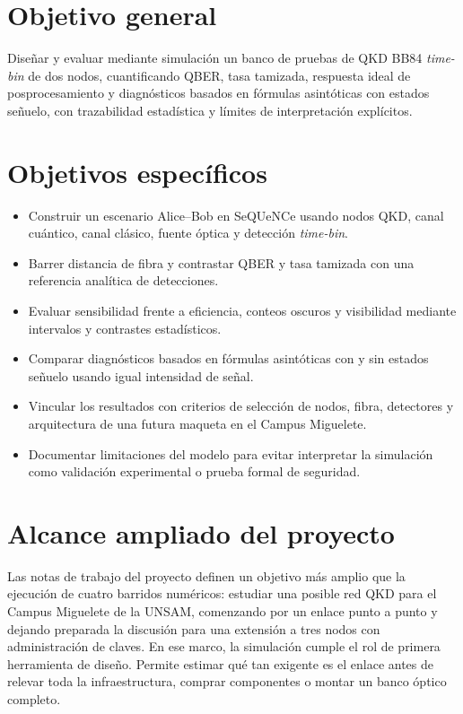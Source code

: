 \section{Objetivo general}

Diseñar y evaluar mediante simulación un banco de pruebas de QKD BB84 \textit{time-bin} de dos nodos, cuantificando QBER, tasa tamizada, respuesta ideal de posprocesamiento y diagnósticos basados en fórmulas asintóticas con estados señuelo, con trazabilidad estadística y límites de interpretación explícitos.

\section{Objetivos específicos}

\begin{itemize}
  \item Construir un escenario Alice--Bob en SeQUeNCe usando nodos QKD, canal cuántico, canal clásico, fuente óptica y detección \textit{time-bin}.
  \item Barrer distancia de fibra y contrastar QBER y tasa tamizada con una referencia analítica de detecciones.
  \item Evaluar sensibilidad frente a eficiencia, conteos oscuros y visibilidad mediante intervalos y contrastes estadísticos.
  \item Comparar diagnósticos basados en fórmulas asintóticas con y sin estados señuelo usando igual intensidad de señal.
  \item Vincular los resultados con criterios de selección de nodos, fibra, detectores y arquitectura de una futura maqueta en el Campus Miguelete.
  \item Documentar limitaciones del modelo para evitar interpretar la simulación como validación experimental o prueba formal de seguridad.
\end{itemize}

\section{Alcance ampliado del proyecto}

Las notas de trabajo del proyecto definen un objetivo más amplio que la ejecución de cuatro barridos numéricos: estudiar una posible red QKD para el Campus Miguelete de la UNSAM, comenzando por un enlace punto a punto y dejando preparada la discusión para una extensión a tres nodos con administración de claves. En ese marco, la simulación cumple el rol de primera herramienta de diseño. Permite estimar qué tan exigente es el enlace antes de relevar toda la infraestructura, comprar componentes o montar un banco óptico completo.

